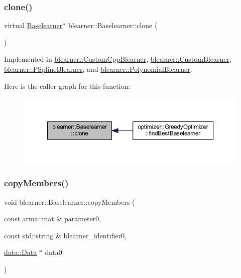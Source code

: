 \subsubsection{\texorpdfstring{clone()}{clone()}}
{\footnotesize\ttfamily virtual \mbox{\hyperlink{classblearner_1_1_baselearner}{Baselearner}}$\ast$ blearner\+::\+Baselearner\+::clone (\begin{DoxyParamCaption}{ }\end{DoxyParamCaption})\hspace{0.3cm}{\ttfamily [pure virtual]}}



Implemented in \mbox{\hyperlink{classblearner_1_1_custom_cpp_blearner_a8b76705131d397974cd208fdcfd70496}{blearner\+::\+Custom\+Cpp\+Blearner}}, \mbox{\hyperlink{classblearner_1_1_custom_blearner_a7ceeee2b7fffd11f376018bc1d3cfba1}{blearner\+::\+Custom\+Blearner}}, \mbox{\hyperlink{classblearner_1_1_p_spline_blearner_a6fca532d2d20dfa284acc474ee1d7531}{blearner\+::\+P\+Spline\+Blearner}}, and \mbox{\hyperlink{classblearner_1_1_polynomial_blearner_a4a93ace818c330e5d1f572108ba061c0}{blearner\+::\+Polynomial\+Blearner}}.

Here is the caller graph for this function\+:\nopagebreak
\begin{figure}[H]
\begin{center}
\leavevmode
\includegraphics[width=350pt]{classblearner_1_1_baselearner_a8e12c6739f085917a7d2da6570c51a21_icgraph}
\end{center}
\end{figure}
\mbox{\label{classblearner_1_1_baselearner_ae8f114ca7c497f03c80de5981c7f811d}} 
\subsubsection{\texorpdfstring{copy\+Members()}{copyMembers()}}
{\footnotesize\ttfamily void blearner\+::\+Baselearner\+::copy\+Members (\begin{DoxyParamCaption}\item[{const arma\+::mat \&}]{parameter0,  }\item[{const std\+::string \&}]{blearner\+\_\+identifier0,  }\item[{\mbox{\hyperlink{classdata_1_1_data}{data\+::\+Data}} $\ast$}]{data0 }\end{DoxyParamCaption})}

